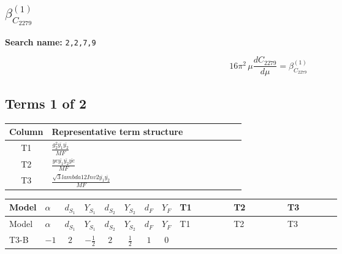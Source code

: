 \documentclass[8pt]{article}
\begin{document}
\begin{landscape}
\section*{$\beta_{C_{2279}}^{(1)}$}
\noindent\textbf{Search name: }\texttt{2,2,7,9}\par\smallskip
\[16\pi^2\,\mu\frac{d C_{2279}}{d\mu}=\beta_{C_{2279}}^{(1)}\]
\subsection*{Terms 1 of 2}
\begin{center}
\begin{tabular}{@{}c >{\raggedright\arraybackslash}p{0.82\linewidth}@{}}
\toprule
Column & Representative term structure \\
\midrule
T1 & \(\displaystyle \frac{g_{2}^{2} \overline{y_{1}} \overline{y_{2}}}{MF}\) \\
\midrule
T2 & \(\displaystyle \frac{ye \overline{y_{1}} \overline{y_{2}} \overline{ye}}{MF}\) \\
\midrule
T3 & \(\displaystyle \frac{\sqrt{3} lambda12Inv2 \overline{y_{1}} \overline{y_{2}}}{MF}\) \\
\midrule
\bottomrule
\end{tabular}
\end{center}
\smallskip
\tiny
\begin{longtable}{@{}llcccccc >{\raggedright\arraybackslash}p{0.21\linewidth} >{\raggedright\arraybackslash}p{0.21\linewidth} >{\raggedright\arraybackslash}p{0.21\linewidth}@{}}
\toprule
Model & $\alpha$ & $d_{S_1}$ & $Y_{S_1}$ & $d_{S_2}$ & $Y_{S_2}$ & $d_F$ & $Y_F$ & T1 & T2 & T3 \\
\midrule
\endfirsthead
\toprule
Model & $\alpha$ & $d_{S_1}$ & $Y_{S_1}$ & $d_{S_2}$ & $Y_{S_2}$ & $d_F$ & $Y_F$ & T1 & T2 & T3 \\
\midrule
\endhead
T3-B & $-1$ & $2$ & $-\frac{1}{2}$ & $2$ & $\frac{1}{2}$ & $1$ & $0$ & \scriptsize\adjustbox{max width=\linewidth}{$\begin{gathered} \frac{3 g_{2}^{2} \overline{y_{1}} \overline{y_{2}}}{4 MF}\end{gathered}$} & \scriptsize\adjustbox{max width=\linewidth}{$\begin{gathered} - \frac{ye \overline{y_{1}} \overline{y_{2}} \overline{ye}}{4 MF}\end{gathered}$} & \scriptsize\adjustbox{max width=\linewidth}{$\begin{gathered} \frac{\sqrt{3} lambda12Inv2 \overline{y_{1}} \overline{y_{2}}}{3 MF}\end{gathered}$} \\

\end{longtable}
\end{landscape}
\end{document}

